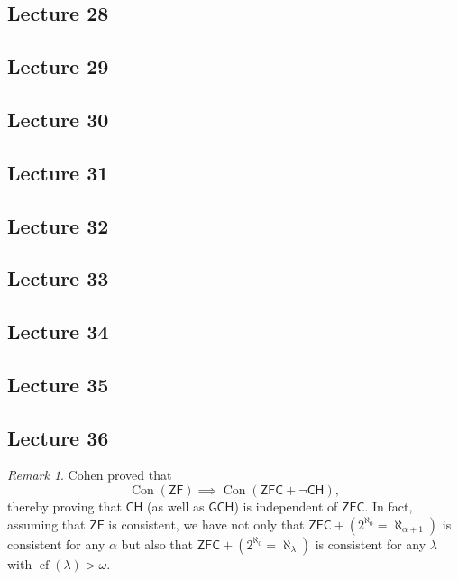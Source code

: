 \documentclass[10pt,letterpaper,cm]{nupset}
\theoremstyle{definition}
\theoremstyle{theorem}
\theoremstyle{remark}
\newtheorem{remark}[definition]{Remark}
\newcommand{\1}{\mathbf{1}}
\newcommand{\0}{\vec 0}
\newcommand{\zf}{\mathsf{ZF}}
\newcommand{\zfc}{\mathsf{ZFC}}
\DeclareMathOperator{\cf}{cf}
\DeclareMathOperator{\con}{Con}
\begin{document}
\subsection{Lecture 28}

\subsection{Lecture 29}

\subsection{Lecture 30}

\subsection{Lecture 31}

\subsection{Lecture 32}

\subsection{Lecture 33}

\subsection{Lecture 34}

\subsection{Lecture 35}

\subsection{Lecture 36}

\begin{remark}
Cohen proved that $$\con(\zf) \implies \con(\zfc + \neg{\mathsf{CH}}),$$ thereby proving that $\mathsf{CH}$ (as well as $\mathsf{GCH}$) is independent of $\zfc$.  In fact, assuming that $\zf$ is consistent, we have not only that $\zfc + \left(2^{\aleph_0} = \aleph_{\alpha +1}\right)$ is consistent for any $\alpha$ but also that $\zfc + \left(2^{\aleph_0} = \aleph_{\lambda}\right)$ is consistent for any $\lambda$ with $\cf(\lambda) > \omega$.
\end{remark}
\end{document}
